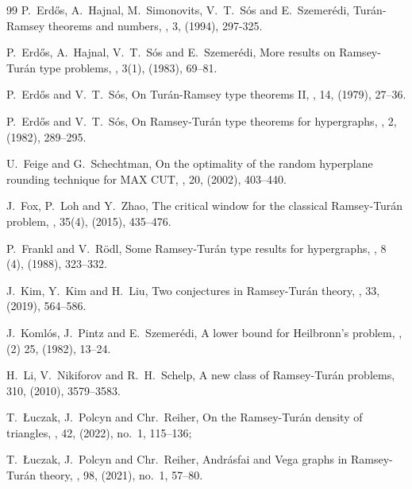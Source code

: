 \documentclass[10pt,a4paper]{article}
\theoremstyle{definition}
\begin{document}
\begin{thebibliography}{99}
P.~Erd\H os, A.~Hajnal, M.~Simonovits, V.~T.~S\'os and E.~Szemer\'edi,
\newblock Tur\'an-Ramsey theorems and  numbers,
, 3, (1994), 297-325.

P.~Erd\H os, A.~Hajnal, V.~T.~S\'os and E.~Szemer\'edi,
\newblock More results on Ramsey-Tur\'an type problems,
, 3(1), (1983), 69--81.

P.~Erd\H os and V.~T.~S\'os,
\newblock On Tur\'an-Ramsey type theorems II,
, 14, (1979), 27--36.

P.~Erd\H os and V.~T.~S\'os,
\newblock On Ramsey-Tur\'an type theorems for hypergraphs,
, 2, (1982), 289--295.

U.~Feige and G.~Schechtman,
\newblock On the optimality of the random hyperplane rounding technique for MAX CUT,
, 20, (2002), 403--440.

J.~Fox, P.~Loh and Y.~Zhao,
\newblock The critical window for the classical {R}amsey-{T}ur\'{a}n problem,
, 35(4), (2015), 435--476.

P.~Frankl and V.~R\"odl,
\newblock Some Ramsey-Tur\'an type results for hypergraphs,
, 8 (4), (1988), 323--332.

J.~Kim, Y.~Kim and H.~Liu,
\newblock Two conjectures in Ramsey-Tur\'an theory,
, 33, (2019), 564--586.

J.~Koml\'os, J.~Pintz and E.~Szemer\'edi,
\newblock A lower bound for Heilbronn's problem,
, (2) 25, (1982), 13--24.

H.~Li, V.~Nikiforov and R.~H.~Schelp,
\newblock A new class of Ramsey-Tur\'an problems,
 310, (2010), 3579--3583.

T.~{\L}uczak, J.~Polcyn and Chr.~Reiher,
\newblock On the Ramsey-Tur\'an density of triangles,
, 42, (2022), no.~1, 115--136;



T.~{\L}uczak, J.~Polcyn and Chr.~Reiher,
\newblock Andr\'asfai and Vega graphs in Ramsey-Tur\'an theory,
, 98, (2021), no.~1, 57--80.


\end{thebibliography}
\end{document}
